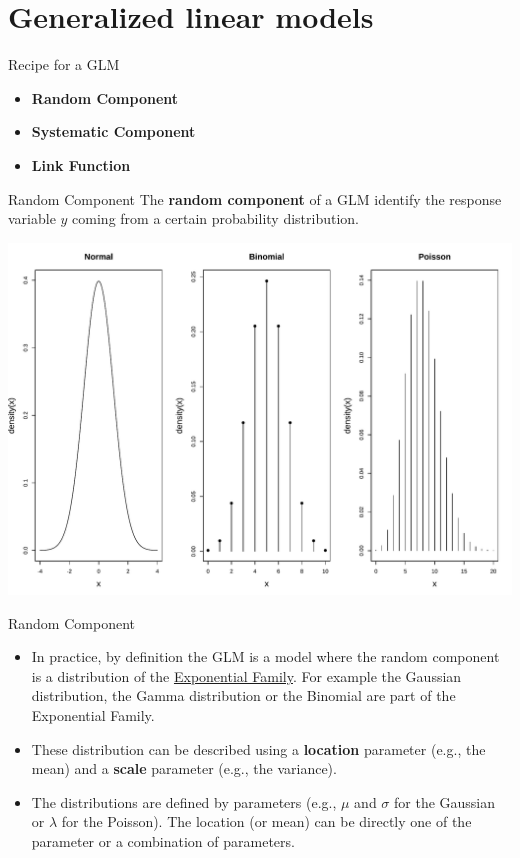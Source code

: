 \documentclass[
  ignorenonframetext,
]{beamer}
\providecommand{\tightlist}{%
  \setlength{\itemsep}{0pt}\setlength{\parskip}{0pt}}
\begin{document}
\section{Generalized linear models}\label{generalized-linear-models}

\begin{frame}{Recipe for a GLM}
\label{recipe-for-a-glm}
\begin{itemize}
\tightlist
\item
  \textbf{Random Component}
\item
  \textbf{Systematic Component}
\item
  \textbf{Link Function}
\end{itemize}
\end{frame}

\begin{frame}{Random Component}
\label{random-component}
The \textbf{random component} of a GLM identify the response variable
\(y\) coming from a certain probability distribution.

\begin{center}
\includegraphics[width=0.5\linewidth,height=\textheight,keepaspectratio]{bayesian-glm_files/mediabag/bayesian-glm_files/figure-beamer/unnamed-chunk-12-1.pdf}
\end{center}
\end{frame}

\begin{frame}{Random Component}
\label{random-component-1}
\begin{itemize}
\tightlist
\item
  In practice, by definition the GLM is a model where the random
  component is a distribution of the
  \href{https://en.wikipedia.org/wiki/Exponential_family}{Exponential
  Family}. For example the Gaussian distribution, the Gamma distribution
  or the Binomial are part of the Exponential Family.
\item
  These distribution can be described using a \textbf{location}
  parameter (e.g., the mean) and a \textbf{scale} parameter (e.g., the
  variance).
\item
  The distributions are defined by parameters (e.g., \(\mu\) and
  \(\sigma\) for the Gaussian or \(\lambda\) for the Poisson). The
  location (or mean) can be directly one of the parameter or a
  combination of parameters.
\end{itemize}
\end{frame}
\end{document}
